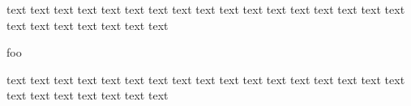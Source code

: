 \documentclass{article}
\newenvironment{tightcenter}{%
  \setlength\topsep{0pt}
  \setlength\parskip{0pt}
  \begin{center}
}{%
  \end{center}
}
\begin{document}
text text text text text text text text text text text text text text text text text text text text text text text text
\begin{tightcenter}
foo
\end{tightcenter}
text text text text text text text text text text text text text text text text text text text text text text text text
\end{document}
